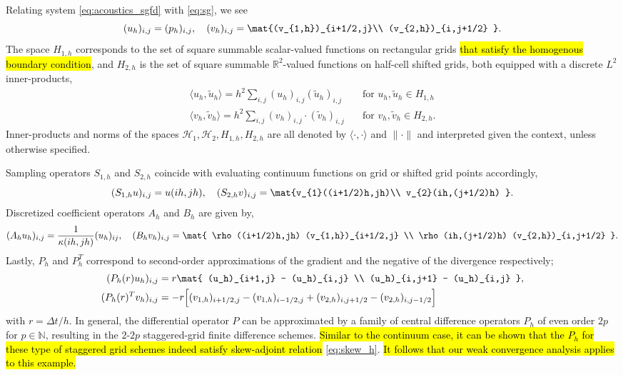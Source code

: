 Relating system \ref{eq:acoustics_sgfd} with \ref{eq:sg}, we see
\[
	(u_h)_{i,j} = (p_h)_{i,j}, \quad 
	(v_h)_{i,j} = \mat{(v_{1,h})_{i+1/2,j}\\ 
				  (v_{2,h})_{i,j+1/2} }.
\]
The space $H_{1,h}$ corresponds to the set of square summable scalar-valued
functions on rectangular grids \hl{that satisfy the homogenous boundary condition}, and $H_{2,h}$ is the set of square summable $\mathbb R^2$-valued functions on half-cell shifted grids, both equipped with a discrete $L^2$ inner-products,  
\begin{equation*}
\begin{split}
	\langle u_h,\tilde u_h\rangle = h^2 \sum_{i,j} (u_h)_{i,j} (\tilde u_h)_{i,j} &\quad 	\text{for } u_h,\tilde u_h \in H_{1,h}\\
	\langle v_h, \tilde v_h \rangle = h^2 \sum_{i,j} (v_h)_{i,j} \cdot (\tilde v_h)_{i,j} &\quad
	\text{for } v_h,\tilde v_h \in H_{2,h}.
\end{split}
\end{equation*}
Inner-products and norms of the spaces $\mathcal H_1, \mathcal H_2, H_{1,h}, H_{2,h}$ are all denoted by $\langle\cdot,\cdot\rangle$ and $\|\cdot\|$ and interpreted given the context, unless otherwise specified.

Sampling operators $S_{1,h}$ and $S_{2,h}$ coincide with evaluating continuum functions on grid or shifted grid points accordingly,
\[
	(S_{1,h} u)_{i,j} = u(ih,jh), \quad 
	(S_{2,h} v)_{i,j} = \mat{v_{1}((i+1/2)h,jh)\\ 
				  v_{2}(ih,(j+1/2)h) }.
\]
Discretized coefficient operators $A_h$ and $B_h$ are given by,
\[
	(A_h u_h)_{i,j} = \frac{1}{\kappa(ih,jh)} (u_h)_{ij}, \quad
	(B_h v_h)_{i,j} = \mat{ \rho((i+1/2)h,jh) (v_{1,h})_{i+1/2,j} \\
					 \rho(ih,(j+1/2)h) (v_{2,h})_{i,j+1/2} }.
\]
Lastly, $P_h$ and $P_h^T$ correspond to second-order approximations of the gradient and the negative of the divergence respectively;
\begin{equation*}
\begin{split}
	(P_{h}(r) u_h)_{i,j} &= r \mat{ (u_h)_{i+1,j} - (u_h)_{i,j} \\
					     (u_h)_{i,j+1} - (u_h)_{i,j} }, \\
	(P_{h}(r)^T v_h)_{i,j} &= -r \Big[ (v_{1,h})_{i+1/2,j} - (v_{1,h})_{i-1/2,j} + (v_{2,h})_{i,j+1/2} - (v_{2,h})_{i,j-1/2} \Big]
\end{split}
\end{equation*}
with $r =  \Delta t/h$.
In general, the differential operator $P$ can be approximated by a family of central difference operators $P_h$ of even order $2p$ for $p\in\mathbb N$, resulting in the $2$-$2p$ staggered-grid finite difference schemes.
\hl{Similar to the continuum case, it can be shown that the $P_h$ for these type of staggered grid schemes indeed satisfy skew-adjoint relation} \ref{eq:skew_h}.
\hl{It follows that our weak convergence analysis applies to this example.}

